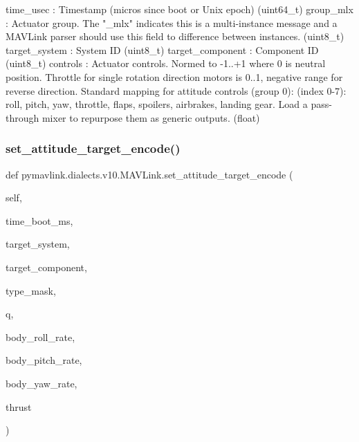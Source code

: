 \begin{DoxyVerb}
\begin{DoxyVerb}
\begin{DoxyVerb}
\begin{DoxyVerb}
\begin{DoxyVerb}
\begin{DoxyVerb}
\begin{DoxyVerb}
\begin{DoxyVerb}
\begin{DoxyVerb}
\begin{DoxyVerb}
\begin{DoxyVerb}
time_usec                 : Timestamp (micros since boot or Unix epoch) (uint64_t)
group_mlx                 : Actuator group. The "_mlx" indicates this is a multi-instance message and a MAVLink parser should use this field to difference between instances. (uint8_t)
target_system             : System ID (uint8_t)
target_component          : Component ID (uint8_t)
controls                  : Actuator controls. Normed to -1..+1 where 0 is neutral position. Throttle for single rotation direction motors is 0..1, negative range for reverse direction. Standard mapping for attitude controls (group 0): (index 0-7): roll, pitch, yaw, throttle, flaps, spoilers, airbrakes, landing gear. Load a pass-through mixer to repurpose them as generic outputs. (float)\end{DoxyVerb}
 \mbox{\label{classpymavlink_1_1dialects_1_1v10_1_1MAVLink_aec8e5dddc7663ffa886597fc6c365174}} 
\subsubsection{\texorpdfstring{set\+\_\+attitude\+\_\+target\+\_\+encode()}{set\_attitude\_target\_encode()}}
{\footnotesize\ttfamily def pymavlink.\+dialects.\+v10.\+M\+A\+V\+Link.\+set\+\_\+attitude\+\_\+target\+\_\+encode (\begin{DoxyParamCaption}\item[{}]{self,  }\item[{}]{time\+\_\+boot\+\_\+ms,  }\item[{}]{target\+\_\+system,  }\item[{}]{target\+\_\+component,  }\item[{}]{type\+\_\+mask,  }\item[{}]{q,  }\item[{}]{body\+\_\+roll\+\_\+rate,  }\item[{}]{body\+\_\+pitch\+\_\+rate,  }\item[{}]{body\+\_\+yaw\+\_\+rate,  }\item[{}]{thrust }\end{DoxyParamCaption})}


\end{DoxyVerb}
\end{DoxyVerb}
\end{DoxyVerb}
\end{DoxyVerb}
\end{DoxyVerb}
\end{DoxyVerb}
\end{DoxyVerb}
\end{DoxyVerb}
\end{DoxyVerb}
\end{DoxyVerb}
